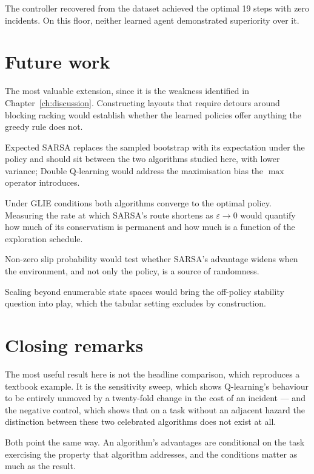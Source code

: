  The controller
recovered from the dataset achieved the optimal 19 steps with zero incidents. On this floor,
neither learned agent demonstrated superiority over it.

\section{Future work}

 The most valuable extension, since it is the
weakness identified in Chapter~\ref{ch:discussion}. Constructing layouts that require detours
around blocking racking would establish whether the learned policies offer anything the greedy rule
does not.

 Expected SARSA \cite{vanseijen2009} replaces the
sampled bootstrap with its expectation under the policy and should sit between the two algorithms
studied here, with lower variance; Double Q-learning \cite{hasselt2010} would address the
maximisation bias the $\max$ operator introduces.

 Under GLIE conditions both algorithms converge to the
optimal policy. Measuring the rate at which SARSA's route shortens as $\varepsilon \to 0$ would
quantify how much of its conservatism is permanent and how much is a function of the exploration
schedule.

 Non-zero slip probability would test whether SARSA's advantage
widens when the environment, and not only the policy, is a source of randomness.

 Scaling beyond enumerable state spaces would bring the
off-policy stability question into play, which the tabular setting excludes by construction.

\section{Closing remarks}

The most useful result here is not the headline comparison, which reproduces a textbook example.
It is the sensitivity sweep, which shows Q-learning's behaviour to be entirely unmoved by a
twenty-fold change in the cost of an incident --- and the negative control, which shows that on a
task without an adjacent hazard the distinction between these two celebrated algorithms does not
exist at all.

Both point the same way. An algorithm's advantages are conditional on the task exercising the
property that algorithm addresses, and the conditions matter as much as the result.
